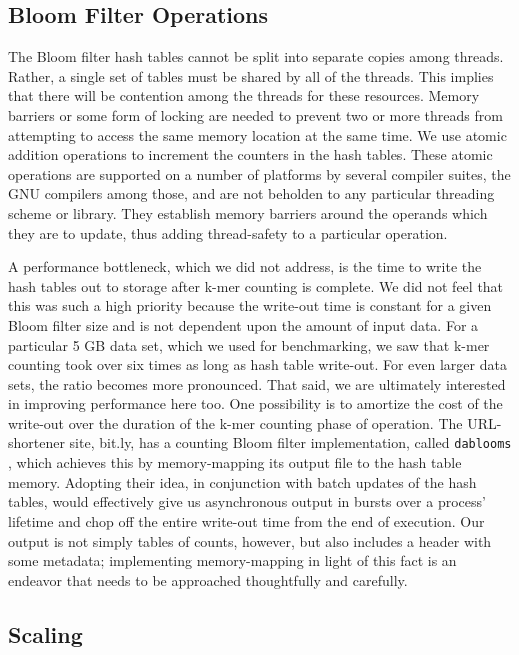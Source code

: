 \documentclass{article}
\begin{document}
\subsection{Bloom Filter Operations}

The Bloom filter hash tables cannot be split into separate copies among threads. Rather, a single set of tables must be shared by all of the threads. This implies that there will be contention among the threads for these resources. Memory barriers \citep{web:membar} or some form of locking are needed to prevent two or more threads from attempting to access the same memory location at the same time. We use atomic addition operations to increment the counters in the hash tables. These atomic operations \citep{web:atomics} are supported on a number of platforms by several compiler suites, the GNU compilers among those, and are not beholden to any particular threading scheme or library. They establish memory barriers around the operands which they are to update, thus adding thread-safety to a particular operation.

A performance bottleneck, which we did not address, is the time to write the hash tables out to storage after k-mer counting is complete. We did not feel that this was such a high priority because the write-out time is constant for a given Bloom filter size and is not dependent upon the amount of input data. For a particular 5 GB data set, which we used for benchmarking, we saw that k-mer counting took over six times as long as hash table write-out. For even larger data sets, the ratio becomes more pronounced. That said, we are ultimately interested in improving performance here too. One possibility is to amortize the cost of the write-out over the duration of the k-mer counting phase of operation. The URL-shortener site, bit.ly, has a counting Bloom filter implementation, called \texttt{dablooms} \citep{web:dablooms}, which achieves this by memory-mapping its output file to the hash table memory. Adopting their idea, in conjunction with batch updates of the hash tables, would effectively give us asynchronous output in bursts over a process' lifetime and chop off the entire write-out time from the end of execution. Our output is not simply tables of counts, however, but also includes a header with some metadata; implementing memory-mapping in light of this fact is an endeavor that needs to be approached thoughtfully and carefully.

\subsection{Scaling}
\end{document}
